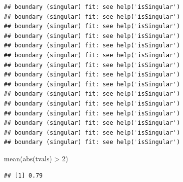\documentclass[
  12pt,
]{krantz}
\newenvironment{Shaded}{\begin{snugshade}}{\end{snugshade}}
\newcommand{\AttributeTok}[1]{\textcolor[rgb]{0.77,0.63,0.00}{#1}}
\newcommand{\ConstantTok}[1]{\textcolor[rgb]{0.00,0.00,0.00}{#1}}
\newcommand{\DecValTok}[1]{\textcolor[rgb]{0.00,0.00,0.81}{#1}}
\newcommand{\DocumentationTok}[1]{\textcolor[rgb]{0.56,0.35,0.01}{\textbf{\textit{#1}}}}
\newcommand{\FunctionTok}[1]{\textcolor[rgb]{0.00,0.00,0.00}{#1}}
\newcommand{\NormalTok}[1]{#1}
\newcommand{\OtherTok}[1]{\textcolor[rgb]{0.56,0.35,0.01}{#1}}
\newcommand{\SpecialCharTok}[1]{\textcolor[rgb]{0.00,0.00,0.00}{#1}}
\theoremstyle{definition}
\theoremstyle{definition}
\theoremstyle{definition}
\theoremstyle{definition}
\theoremstyle{remark}
\begin{document}
\begin{Shaded}
\end{Shaded}

\begin{verbatim}
## boundary (singular) fit: see help('isSingular')
## boundary (singular) fit: see help('isSingular')
## boundary (singular) fit: see help('isSingular')
## boundary (singular) fit: see help('isSingular')
## boundary (singular) fit: see help('isSingular')
## boundary (singular) fit: see help('isSingular')
## boundary (singular) fit: see help('isSingular')
## boundary (singular) fit: see help('isSingular')
## boundary (singular) fit: see help('isSingular')
## boundary (singular) fit: see help('isSingular')
## boundary (singular) fit: see help('isSingular')
## boundary (singular) fit: see help('isSingular')
## boundary (singular) fit: see help('isSingular')
## boundary (singular) fit: see help('isSingular')
## boundary (singular) fit: see help('isSingular')
\end{verbatim}

\begin{Shaded}
\begin{Highlighting}[]
\FunctionTok{mean}\NormalTok{(}\FunctionTok{abs}\NormalTok{(tvals) }\SpecialCharTok{\textgreater{}} \DecValTok{2}\NormalTok{)}
\end{Highlighting}
\end{Shaded}

\begin{verbatim}
## [1] 0.79
\end{verbatim}
\end{document}
